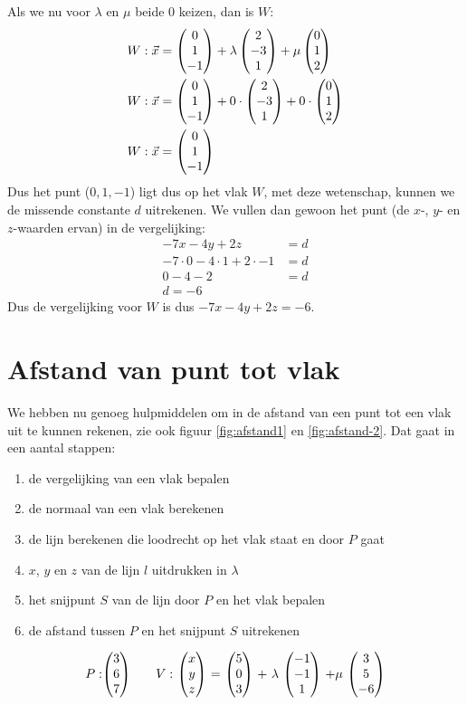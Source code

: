 Als we nu voor $\lambda$ en $\mu$ beide $0$ keizen, dan is $W$: 
\begin{align*}
  W: \vec{x} &= \begin{pmatrix} 0 \\ 1 \\ -1 \end{pmatrix} + \lambda \begin{pmatrix} 2 \\ -3 \\ 1 \end{pmatrix} + \mu\begin{pmatrix} 0 \\ 1 \\ 2 \end{pmatrix} \\
  W: \vec{x} &= \begin{pmatrix} 0 \\ 1 \\ -1 \end{pmatrix} + 0\cdot\begin{pmatrix} 2 \\ -3 \\ 1 \end{pmatrix} + 0\cdot\begin{pmatrix} 0 \\ 1 \\ 2 \end{pmatrix} \\
  W: \vec{x} &= \begin{pmatrix} 0 \\ 1 \\ -1 \end{pmatrix} 
\end{align*}
Dus het punt ($0,1,-1$) ligt dus op het vlak $W$, met deze wetenschap, kunnen we de missende constante $d$ uitrekenen. We vullen dan gewoon het punt (de $x$-, $y$- en $z$-waarden ervan) in de vergelijking:
\begin{align*}
  -7x-4y+2z &= d \\
  -7\cdot0 - 4\cdot1+2\cdot -1 &= d \\
  0 - 4 - 2 &= d \\ 
  d = -6
\end{align*}
Dus de vergelijking voor $W$ is dus $-7x-4y+2z = -6$. 

\section{Afstand van punt tot vlak}
We hebben nu genoeg hulpmiddelen om in \RD de afstand van een punt tot een vlak uit te kunnen rekenen, zie ook figuur \ref{fig:afstand1} en \ref{fig:afstand-2}. Dat gaat in een aantal stappen:
\begin{enumerate}[label=(\alph*)]
	\item de vergelijking van een vlak bepalen
	\item de normaal van een vlak berekenen
	\item de lijn berekenen die  loodrecht op het vlak staat  en door $P$ gaat
	\item $x$, $y$ en $z$ van de lijn $l$  uitdrukken in $\lambda$
	\item het snijpunt $S$  van de lijn door $P$  en het vlak bepalen
	\item de afstand tussen $P$  en het snijpunt $S$  uitrekenen
\end{enumerate}	


\[P: \vecdrie{3}{6}{7} \quad \quad V:\ \vecdrie{x}{y}{z} \ = \ \vecdrie{5}{0}{3} \ + \ \lambda\ \vecdrie{-1}{-1}{1} \ + \mu\ \vecdrie{3}{5}{-6}\]

